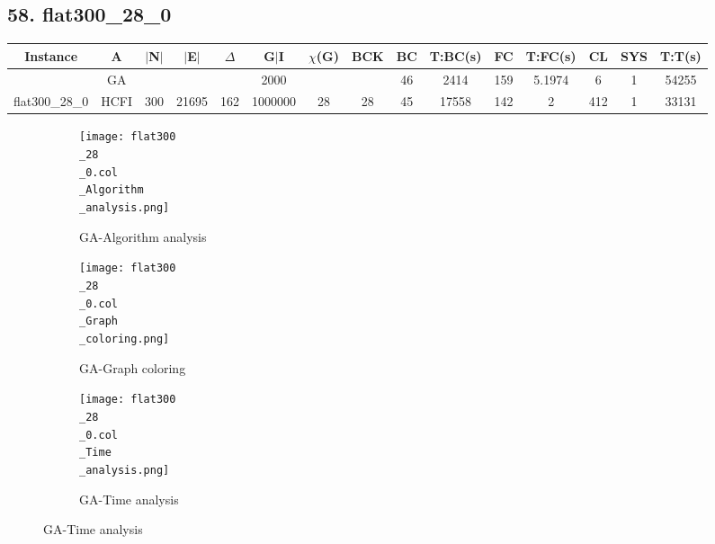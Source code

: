 \documentclass[10pt]{article}
\begin{document}
\subsection*{\hspace{0,9073976cm} 58. flat300\_28\_0}
\begin{table}[H]
\centering
\begin{tabular}{|c|c|c|c|c|c|c|c|c|c|c|c|c|c|c|}
\hline
Instance& A &$|$N$|$ & $|$E$|$ & $\Delta$ & G$|$I & $\chi$(G) &BCK&BC & T:BC(s) & FC & T:FC(s) & CL & SYS & T:T(s) \\ \hline \hline

&GA&       &                   &                     &    2000     &     \cellcolor{yellow} & {\cellcolor{yellow}}& {{\cellcolor{green}46}}
&2414   &159        &5.1974                   &6                    &1          &54255        \\ \cline{2-2} \cline{6-6} \cline{9-15}
 \multirow{-2}{*}{flat300\_28\_0} &HCFI   &\multirow{-2}{*}{300}   &\multirow{-2}{*}{21695}     &\multirow{-2}{*}{162}     &1000000     &\multirow{-2}{*}{\cellcolor{yellow}28}      & \multirow{-2}{*}{\cellcolor{yellow}28}    &{\cellcolor{green}45}     &17558         &142    &2         &412    &1     &33131        \\ \hline
\end{tabular}
\end{table}
\graphicspath{{./Core1/Solutions/GA/flat300\_28\_0.col}}
\begin{figure}[H]
\begin{subfigure}{.33\textwidth}
  \centering
  \texttt{[image: flat300\\\_28\\\_0.col\\\_Algorithm\\\_analysis.png]}
  \caption{GA-Algorithm analysis}
   \label{fig:subfig1}
\end{subfigure}%
\begin{subfigure}{.33\textwidth}
  \centering
  \texttt{[image: flat300\\\_28\\\_0.col\\\_Graph\\\_coloring.png]}
  \caption{GA-Graph coloring}
  \label{fig:subfig2}
\end{subfigure}
\begin{subfigure}{.33\textwidth}
  \centering
  \texttt{[image: flat300\\\_28\\\_0.col\\\_Time\\\_analysis.png]}
  \caption{GA-Time analysis}
  \end{subfigure}
\end{figure}
\end{document}
